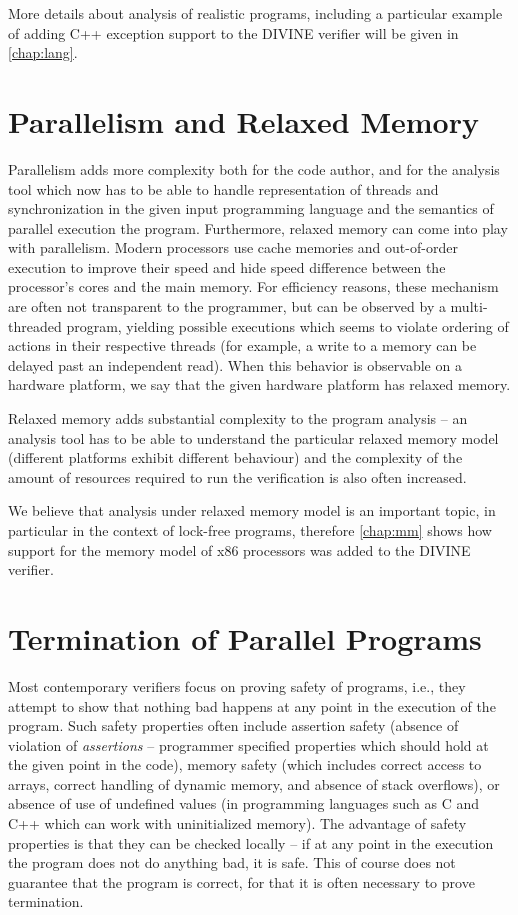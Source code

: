 More details about analysis of realistic programs, including a particular
example of adding C++ exception support to the DIVINE verifier will be given in
\autoref{chap:lang}.

\section{Parallelism and Relaxed Memory}

Parallelism adds more complexity both for the code author, and for the analysis tool which now has to be able to handle representation of threads and synchronization in the given input programming language and the semantics of parallel execution the program.
Furthermore, relaxed memory can come into play with parallelism.
Modern processors use cache memories and out-of-order execution to improve their speed and hide speed difference between the processor's cores and the main memory.
For efficiency reasons, these mechanism are often not transparent to the programmer, but can be observed by a multi-threaded program, yielding possible executions which seems to violate ordering of actions in their respective threads (for example, a write to a memory can be delayed past an independent read).
When this behavior is observable on a hardware platform, we say that the given hardware platform has relaxed memory.

Relaxed memory adds substantial complexity to the program analysis --
an analysis tool has to be able to understand the particular relaxed memory model (different platforms exhibit different behaviour) and the complexity of the amount of resources required to run the verification is also often increased.

We believe that analysis under relaxed memory model is an important topic,
in particular in the context of lock-free programs, therefore \autoref{chap:mm}
shows how support for the memory model of x86 processors was added to the
DIVINE verifier.

\section{Termination of Parallel Programs}

Most contemporary verifiers focus on proving safety of programs, i.e., they
attempt to show that nothing bad happens at any point in the execution of the
program.
Such safety properties often include assertion safety (absence of violation of \emph{assertions} -- programmer specified properties which should hold at the given point in the code), memory safety (which includes correct access to arrays, correct handling of dynamic memory, and absence of stack overflows), or absence of use of undefined values (in programming languages such as C and C++ which can work with uninitialized memory).
The advantage of safety properties is that they can be checked locally -- if at
any point in the execution the program does not do anything bad, it is safe.
This of course does not guarantee that the program is correct, for that it is often necessary to prove termination.

